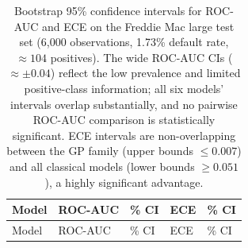 \documentclass[
  letterpaper,
  DIV=11,
  numbers=noendperiod]{scrartcl}
\begin{document}
\begin{longtable}[]{@{}
  >{\raggedright\arraybackslash}p{}
  >{\centering\arraybackslash}p{}
  >{\centering\arraybackslash}p{}
  >{\centering\arraybackslash}p{}
  >{\centering\arraybackslash}p{}@{}}
\caption{Bootstrap 95\% confidence intervals for ROC-AUC and ECE on the
Freddie Mac large test set (6,000 observations, 1.73\% default rate,
\(\approx 104\) positives). The wide ROC-AUC CIs (\(\approx \pm 0.04\))
reflect the low prevalence and limited positive-class information; all
six models' intervals overlap substantially, and no pairwise ROC-AUC
comparison is statistically significant. ECE intervals are
non-overlapping between the GP family (upper bounds \(\leq 0.007\)) and
all classical models (lower bounds \(\geq 0.051\)), a highly significant
advantage.}\label{tbl-app-fm-ci}\tabularnewline
\toprule\noalign{}
\begin{minipage}[b]{\linewidth}\raggedright
Model
\end{minipage} & \begin{minipage}[b]{\linewidth}\centering
ROC-AUC
\end{minipage} & \begin{minipage}[b]{\linewidth}\centering
95\% CI
\end{minipage} & \begin{minipage}[b]{\linewidth}\centering
ECE
\end{minipage} & \begin{minipage}[b]{\linewidth}\centering
95\% CI
\end{minipage} \\
\midrule\noalign{}
\endfirsthead
\toprule\noalign{}
\begin{minipage}[b]{\linewidth}\raggedright
Model
\end{minipage} & \begin{minipage}[b]{\linewidth}\centering
ROC-AUC
\end{minipage} & \begin{minipage}[b]{\linewidth}\centering
95\% CI
\end{minipage} & \begin{minipage}[b]{\linewidth}\centering
ECE
\end{minipage} & \begin{minipage}[b]{\linewidth}\centering
95\% CI
\end{minipage} \\

\end{longtable}
\end{document}
